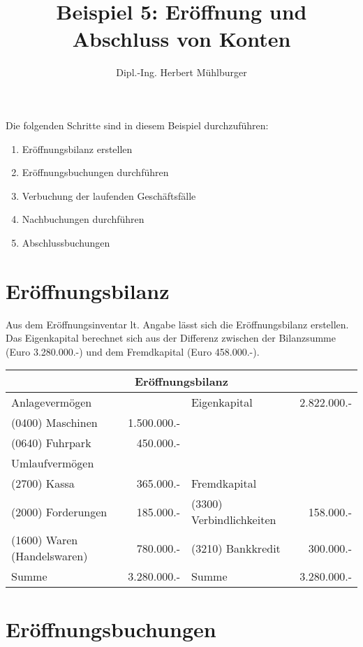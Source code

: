 \documentclass[parskip=half,12pt,a4paper]{scrartcl}
\begin{document}
\title{Beispiel 5: Eröffnung und Abschluss von Konten}
\author{Dipl.-Ing. Herbert Mühlburger}
\maketitle

Die folgenden Schritte sind in diesem Beispiel durchzuführen:
\begin{enumerate}
	\item Eröffnungsbilanz erstellen
	\item Eröffnungsbuchungen durchführen
	\item Verbuchung der laufenden Geschäftsfälle
	\item Nachbuchungen durchführen
	\item Abschlussbuchungen
\end{enumerate}

\section{Eröffnungsbilanz}
Aus dem Eröffnungsinventar lt. Angabe lässt sich die Eröffnungsbilanz erstellen. Das Eigenkapital berechnet sich aus der Differenz zwischen der Bilanzsumme (Euro 3.280.000.-) und dem Fremdkapital (Euro 458.000.-).

\begin{center}
	\begin{tabular}{lr|lr}
		\multicolumn{4}{c}{Eröffnungsbilanz}\\
		\toprule
		Anlagevermögen & & Eigenkapital & 2.822.000.-\\
		(0400) Maschinen & 1.500.000.- & &\\
		(0640) Fuhrpark & 450.000.- & &\\
		Umlaufvermögen & & &\\
		(2700) Kassa & 365.000.- & Fremdkapital &\\
		(2000) Forderungen & 185.000.- & (3300) Verbindlichkeiten & 158.000.-\\
		(1600) Waren (Handelswaren) & 780.000.- & (3210) Bankkredit & 300.000.-\\
		\bottomrule
		Summe & 3.280.000.- & Summe & 3.280.000.-\\
	\end{tabular}
\end{center}

\section{Eröffnungsbuchungen}
\end{document}
